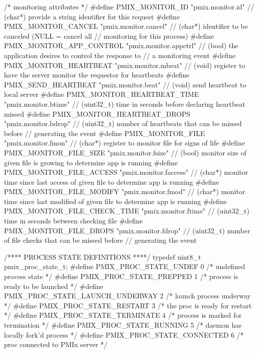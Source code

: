 \begin{codepar}
/* monitoring attributes */
#define PMIX_MONITOR_ID                     "pmix.monitor.id"       // (char*) provide a string identifier for this request
#define PMIX_MONITOR_CANCEL                 "pmix.monitor.cancel"   // (char*) identifier to be canceled (NULL = cancel all
                                                                    //         monitoring for this process)
#define PMIX_MONITOR_APP_CONTROL            "pmix.monitor.appctrl"  // (bool) the application desires to control the response to
                                                                    //        a monitoring event
#define PMIX_MONITOR_HEARTBEAT              "pmix.monitor.mbeat"    // (void) register to have the server monitor the requestor for heartbeats
#define PMIX_SEND_HEARTBEAT                 "pmix.monitor.beat"     // (void) send heartbeat to local server
#define PMIX_MONITOR_HEARTBEAT_TIME         "pmix.monitor.btime"    // (uint32_t) time in seconds before declaring heartbeat missed
#define PMIX_MONITOR_HEARTBEAT_DROPS        "pmix.monitor.bdrop"    // (uint32_t) number of heartbeats that can be missed before
                                                                    //            generating the event
#define PMIX_MONITOR_FILE                   "pmix.monitor.fmon"     // (char*) register to monitor file for signs of life
#define PMIX_MONITOR_FILE_SIZE              "pmix.monitor.fsize"    // (bool) monitor size of given file is growing to determine app is running
#define PMIX_MONITOR_FILE_ACCESS            "pmix.monitor.faccess"  // (char*) monitor time since last access of given file to determine app is running
#define PMIX_MONITOR_FILE_MODIFY            "pmix.monitor.fmod"     // (char*) monitor time since last modified of given file to determine app is running
#define PMIX_MONITOR_FILE_CHECK_TIME        "pmix.monitor.ftime"    // (uint32_t) time in seconds between checking file
#define PMIX_MONITOR_FILE_DROPS             "pmix.monitor.fdrop"    // (uint32_t) number of file checks that can be missed before
                                                                    //            generating the event

/****    PROCESS STATE DEFINITIONS    ****/
typedef uint8_t pmix_proc_state_t;
#define PMIX_PROC_STATE_UNDEF                    0  /* undefined process state */
#define PMIX_PROC_STATE_PREPPED                  1  /* process is ready to be launched */
#define PMIX_PROC_STATE_LAUNCH_UNDERWAY          2  /* launch process underway */
#define PMIX_PROC_STATE_RESTART                  3  /* the proc is ready for restart */
#define PMIX_PROC_STATE_TERMINATE                4  /* process is marked for termination */
#define PMIX_PROC_STATE_RUNNING                  5  /* daemon has locally fork'd process */
#define PMIX_PROC_STATE_CONNECTED                6  /* proc connected to PMIx server */


\end{codepar}
